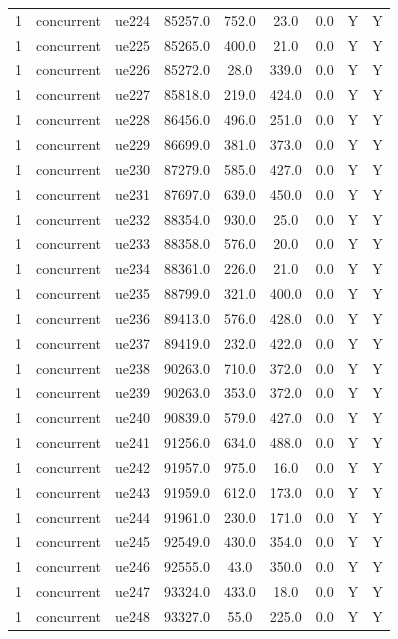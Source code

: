\begin{table}[ht]
\begin{tabular}{|c|c|c|c|c|c|c|c|c|}
1 & concurrent & ue224 & 85257.0 & 752.0 & 23.0 & 0.0 & Y & Y \\
1 & concurrent & ue225 & 85265.0 & 400.0 & 21.0 & 0.0 & Y & Y \\
1 & concurrent & ue226 & 85272.0 & 28.0 & 339.0 & 0.0 & Y & Y \\
1 & concurrent & ue227 & 85818.0 & 219.0 & 424.0 & 0.0 & Y & Y \\
1 & concurrent & ue228 & 86456.0 & 496.0 & 251.0 & 0.0 & Y & Y \\
1 & concurrent & ue229 & 86699.0 & 381.0 & 373.0 & 0.0 & Y & Y \\
1 & concurrent & ue230 & 87279.0 & 585.0 & 427.0 & 0.0 & Y & Y \\
1 & concurrent & ue231 & 87697.0 & 639.0 & 450.0 & 0.0 & Y & Y \\
1 & concurrent & ue232 & 88354.0 & 930.0 & 25.0 & 0.0 & Y & Y \\
1 & concurrent & ue233 & 88358.0 & 576.0 & 20.0 & 0.0 & Y & Y \\
1 & concurrent & ue234 & 88361.0 & 226.0 & 21.0 & 0.0 & Y & Y \\
1 & concurrent & ue235 & 88799.0 & 321.0 & 400.0 & 0.0 & Y & Y \\
1 & concurrent & ue236 & 89413.0 & 576.0 & 428.0 & 0.0 & Y & Y \\
1 & concurrent & ue237 & 89419.0 & 232.0 & 422.0 & 0.0 & Y & Y \\
1 & concurrent & ue238 & 90263.0 & 710.0 & 372.0 & 0.0 & Y & Y \\
1 & concurrent & ue239 & 90263.0 & 353.0 & 372.0 & 0.0 & Y & Y \\
1 & concurrent & ue240 & 90839.0 & 579.0 & 427.0 & 0.0 & Y & Y \\
1 & concurrent & ue241 & 91256.0 & 634.0 & 488.0 & 0.0 & Y & Y \\
1 & concurrent & ue242 & 91957.0 & 975.0 & 16.0 & 0.0 & Y & Y \\
1 & concurrent & ue243 & 91959.0 & 612.0 & 173.0 & 0.0 & Y & Y \\
1 & concurrent & ue244 & 91961.0 & 230.0 & 171.0 & 0.0 & Y & Y \\
1 & concurrent & ue245 & 92549.0 & 430.0 & 354.0 & 0.0 & Y & Y \\
1 & concurrent & ue246 & 92555.0 & 43.0 & 350.0 & 0.0 & Y & Y \\
1 & concurrent & ue247 & 93324.0 & 433.0 & 18.0 & 0.0 & Y & Y \\
1 & concurrent & ue248 & 93327.0 & 55.0 & 225.0 & 0.0 & Y & Y \\

\end{tabular}
\end{table}
